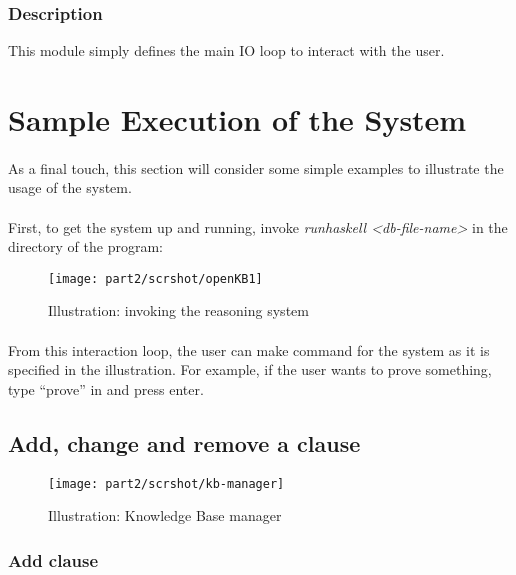 \documentclass[../gr-final.tex]{subfiles}
\begin{document}
\subsubsection{Description}
This module simply defines the main IO loop to interact with the
user.

\section{Sample Execution of the System}
\paragraph{} As a final touch, this section will consider some
simple examples to illustrate the usage of the system.
\paragraph{} First, to get the system up and running, invoke {\em
runhaskell <db-file-name>} in the directory of the program:
\begin{figure}[H]
  \centering
  \texttt{[image: part2/scrshot/openKB1]}
  \caption{Illustration: invoking the reasoning system}
\end{figure}
\paragraph{} From this interaction loop, the user can make
command for the system as it is specified in the illustration.
For example, if the user wants to prove something, type ``prove'' in and press
enter. 
\subsection{Add, change and remove a clause}

\begin{figure}[H]
  \centering
  \texttt{[image: part2/scrshot/kb-manager]}
  \caption{Illustration: Knowledge Base manager}
\end{figure}

\subsubsection{Add clause} 
\end{document}
